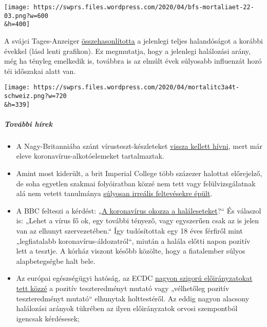\texttt{[image: https://swprs.files.wordpress.com/2020/04/bfs-mortaliaet-22-03.png?w=600\\\&h=400]}

A svájci Tages-Anzeiger
\href{https://interaktiv.tagesanzeiger.ch/2020/uebersterblichkeit-wegen-coronavirus/}{összehasonlította}
a jelenlegi teljes halandóságot a korábbi évekkel (lásd lenti grafikon).
Ez megmutatja, hogy a jelenlegi halálozási arány, még ha tényleg
emelkedik is, továbbra is az elmúlt évek súlyosabb influenzát hozó téi
időszakai alatt van.

\texttt{[image: https://swprs.files.wordpress.com/2020/04/mortalitc3a4t-schweiz.png?w=720\\\&h=339]}

\hypertarget{tovuxe1bbi-huxedrek-2}{%
\subparagraph{\texorpdfstring{\textbf{További
hírek}}{További hírek}}\label{tovuxe1bbi-huxedrek-2}}

\begin{itemize}
\tightlist
\item
  A Nagy-Britanniába szánt vírusteszt-készleteket
  \href{https://www.telegraph.co.uk/news/2020/03/30/uks-attempt-ramp-coronavirus-testing-hindered-key-components/}{vissza
  kellett hívni}, mert már eleve koronavírus-alkotóelemeket
  tartalmaztak.
\item
  Amint most kiderült, a brit Imperial College több százezer halottat
  előrejelző, de soha egyetlen szakmai folyóiratban közzé nem tett vagy
  felülvizsgálatnak alá nem vetett tanulmánya
  \href{https://judithcurry.com/2020/04/01/imperial-college-uk-covid-19-numbers-dont-seem-to-add-up/}{súlyosan
  irreális feltevésekre épült}.
\item
  A BBC felteszi a kérdést:
  „\href{https://www.bbc.com/news/health-51979654}{A koronavírus okozza
  a haláleseteket}?`` És válaszol is: „Lehet a vírus fő ok, egy további
  tényező, vagy egyszerűen csak az is jelen van az elhunyt
  szervezetében.`` Így tudósítottak egy 18 éves férfiről mint
  „legfiatalabb koronavírus-áldozatról``, miután a halála előtti napon
  pozitív lett a tesztje. A kórház viszont később közölte, hogy a
  fiatalember súlyos alapbetegségbe halt bele.
\item
  Az európai egészségügyi hatóság, az ECDC
  \href{https://www.ecdc.europa.eu/sites/default/files/documents/COVID-19-safe-handling-of-bodies-or-persons-dying-from-COVID19.pdf}{nagyon
  szigorú előirányzatokat tett közzé} a pozitív teszteredményt mutató
  vagy „vélhetőleg pozitív teszteredményt mutató`` elhunytak
  holttestéről. Az eddig nagyon alacsony halálozási arányok tükrében az
  ilyen előirányzatok orvosi szempontból igencsak kérdésesek;

\end{itemize}
